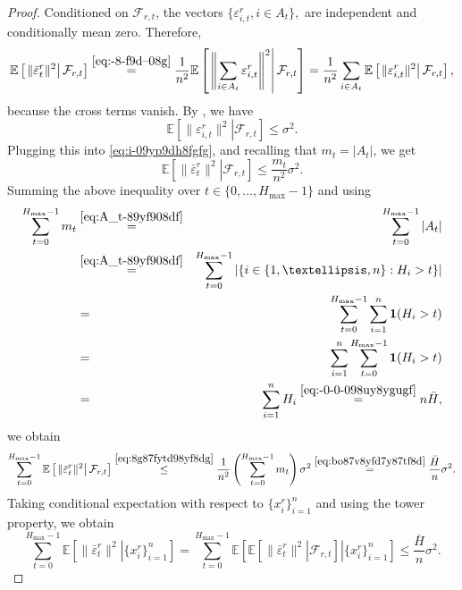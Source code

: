 \documentclass[10pt,a4paper]{amsart}
\newcommand{\ExpCond}[2]{{\mathbb{E}}\left[\left.#1\right\vert#2\right]}
\newcommand{\cF}{\mathcal{F}}
\begin{document}
\begin{proof}
Conditioned on \(\cF_{r,t}\), the vectors
\(
\{\varepsilon_{i,t}^r, i\in A_t\},
\)
are independent and conditionally mean zero.
Therefore,
\begin{equation}\label{eq:i-09yp9dh8fgfg}
\ExpCond{\|\bar\varepsilon_t^r\|^2 }{\cF_{r,t}}
\overset{\eqref{eq:-8-f9d--08g} }{=}
\frac1{n^2}
\ExpCond{\left\|\sum_{i\in A_t}\varepsilon_{i,t}^r\right\|^2 }{ \cF_{r,t} } =
\frac1{n^2}
\sum_{i\in A_t}
\ExpCond{\|\varepsilon_{i,t}^r\|^2 }{ \cF_{r,t}},
\end{equation}
because the cross terms vanish.
By , we have
\[
\ExpCond{\|\varepsilon_{i,t}^r\|^2}{ \cF_{r,t} }
\le
\sigma^2.
\]
Plugging this into \eqref{eq:i-09yp9dh8fgfg}, and recalling that  $m_t = |A_t|$, we get
\begin{equation}\label{eq:8g87fytd98yf8dg}
\ExpCond{\|\bar\varepsilon_t^r\|^2 }{ \cF_{r,t} }
\le
\frac{m_t}{n^2}\sigma^2.
\end{equation}
Summing the above inequality over \(t \in \{0,\dots, H_{\max}-1\}\) and using
\begin{eqnarray}
\sum_{t=0}^{H_{\max}-1} m_t & \overset{\eqref{eq:A_t-89yf908df}}{=} & \sum_{t=0}^{H_{\max}-1} |A_t|  \notag \\
& \overset{\eqref{eq:A_t-89yf908df}}{=} &\sum_{t=0}^{H_{\max}-1} \left| \{i\in\{1,\dots,n\}: H_i>t\} \right|  \notag \\
&=& \sum_{t=0}^{H_{\max}-1} \sum_{i=1}^{n} {\bf 1}(H_i > t)  \notag \\ 
&=& \sum_{i=1}^{n}  \sum_{t=0}^{H_{\max}-1} {\bf 1}(H_i > t) \notag \\ 
&=& \sum_{i=1}^n H_i \overset{\eqref{eq:-0-0-098uy8ygugf}}{=} n\bar H,\label{eq:bo87v8yfd7y87tf8d}
\end{eqnarray}
we obtain
\[
\sum_{t=0}^{H_{\max}-1}
\ExpCond{\|\bar\varepsilon_t^r\|^2}{ \cF_{r,t}  }
\overset{\eqref{eq:8g87fytd98yf8dg}}{\leq}
\frac{1}{n^2}\left(\sum_{t=0}^{H_{\max}-1} m_t\right)\sigma^2
\overset{\eqref{eq:bo87v8yfd7y87tf8d}}{=}
\frac{\bar H}{n}\sigma^2.
\]
Taking conditional expectation with respect to \(\{x_i^r\}_{i=1}^n\) and using the tower property, we obtain
\[
\sum_{t=0}^{H_{\max}-1}
\ExpCond{\|\bar\varepsilon_t^r\|^2}{\{x_i^r\}_{i=1}^n}
=
\sum_{t=0}^{H_{\max}-1}
\ExpCond{
\ExpCond{\|\bar\varepsilon_t^r\|^2}{\cF_{r,t}}
}{\{x_i^r\}_{i=1}^n}
\le
\frac{\bar H}{n}\sigma^2.
\]
\end{proof}
\end{document}
